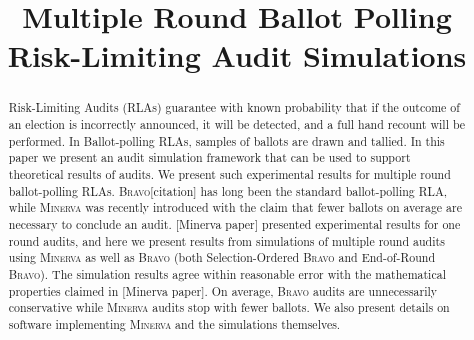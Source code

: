 \documentclass[runningheads]{llncs}
\newcommand{\Minerva}{\textsc{Minerva}\xspace}
\newcommand{\BRAVO}{\textsc{Bravo}\xspace}
\begin{document}
%
\title{Multiple Round Ballot Polling Risk-Limiting Audit Simulations}
%
%

\maketitle              %
%
\begin{abstract}
    Risk-Limiting Audits (RLAs) guarantee with known probability 
    that if the outcome of an 
    election is incorrectly announced, it will be detected, 
    and a full hand recount will be performed. 
    In Ballot-polling RLAs, samples of ballots are drawn and tallied.
    In this paper we present an audit simulation framework
    that can be used to support theoretical results of audits.
    We present such experimental results for multiple round 
    ballot-polling RLAs.
    \BRAVO [citation] has long been the standard ballot-polling RLA,
    while \Minerva was recently introduced with the claim
    that fewer ballots on average are necessary to conclude 
    an audit.
    [Minerva paper] presented experimental
    results for one round audits, and here
    we present results
    from simulations of multiple round audits using \Minerva 
    as well as \BRAVO 
    (both Selection-Ordered 
    \BRAVO and End-of-Round \BRAVO).
    The simulation results agree within reasonable error with
    the mathematical properties claimed in [Minerva paper].
    On average, \BRAVO audits are unnecessarily conservative 
    while \Minerva audits stop with fewer ballots. We also
    present details on software implementing \Minerva and
    the simulations themselves.

\end{abstract}
%
%
%
\end{document}
